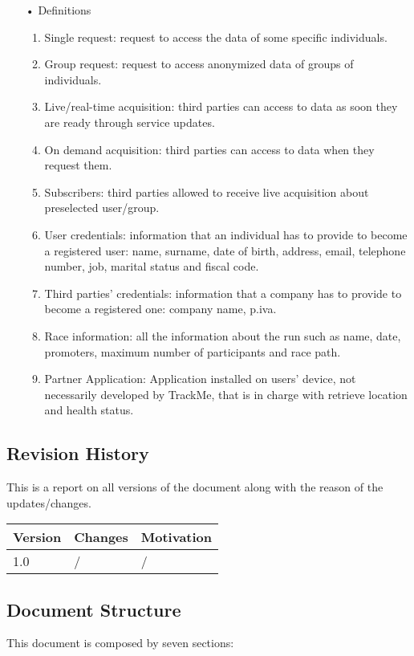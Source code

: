 \begin{enumerate}
\item[•] {\Large Definitions}
	\begin{enumerate}
		\item Single request: request to access the data of some specific  individuals.
		\item Group request: request to access anonymized data of groups of individuals.
		\item Live/real-time acquisition: third parties can access to data as soon they are ready through service updates.
		\item On demand acquisition: third parties can access to data when they request them.
		\item Subscribers: third parties allowed to receive live acquisition about preselected user/group.
		\item User credentials: information that an individual has to provide to become a registered user: name, surname, date of birth, address, email, telephone number, job, marital status and fiscal code. 
		\item Third parties' credentials: information that a company has to provide to become a registered one: company name, p.iva.
		\item Race information: all the information about the run such as name, date, promoters, maximum number of participants and race path.
		\item Partner Application: Application installed on users' device, not necessarily developed by TrackMe, that is in charge with retrieve location and health status. 
	\end{enumerate}
\end{enumerate}
\subsection{Revision History}
This is a report on all versions of the document along with the reason of the updates/changes.

\begin{table}[h]
\centering
\begin{tabular}{|l|p{}|p{}|}
\hline
Version & Changes & Motivation\\ \hline
1.0     & / & / \\ \hline
\end{tabular}
\end{table}

\clearpage
\subsection{Document Structure}
This document is composed by seven sections:

